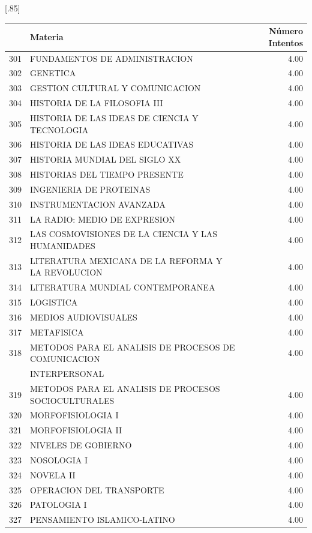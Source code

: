 \documentclass[12pt]{article}
\begin{document}
\begin{table}[ht]
\centering
\scalebox{0.75}[.85]{
\begin{tabular}{rlr}
  \hline
 & Materia & N\'umero Intentos\\ 
  \hline
    301 & FUNDAMENTOS DE ADMINISTRACION & 4.00 \\ 
  302 & GENETICA & 4.00 \\ 
  303 & GESTION CULTURAL Y COMUNICACION & 4.00 \\ 
    304 & HISTORIA DE LA FILOSOFIA III & 4.00 \\ 
  305 & HISTORIA DE LAS IDEAS DE CIENCIA Y TECNOLOGIA & 4.00 \\ 
 306 & HISTORIA DE LAS IDEAS EDUCATIVAS & 4.00 \\ 
  307 & HISTORIA MUNDIAL DEL SIGLO XX & 4.00 \\ 
  308 & HISTORIAS DEL TIEMPO PRESENTE & 4.00 \\ 
  309 & INGENIERIA DE PROTEINAS & 4.00 \\ 
  310 & INSTRUMENTACION AVANZADA & 4.00 \\ 
  311 & LA RADIO: MEDIO DE EXPRESION & 4.00 \\ 
  312 & LAS COSMOVISIONES DE LA CIENCIA Y LAS HUMANIDADES & 4.00 \\ 
  313 & LITERATURA MEXICANA DE LA REFORMA Y LA REVOLUCION & 4.00 \\ 
  314 & LITERATURA MUNDIAL CONTEMPORANEA & 4.00 \\ 
  315 & LOGISTICA & 4.00 \\ 
  316 & MEDIOS AUDIOVISUALES & 4.00 \\ 
  317 & METAFISICA & 4.00 \\ 
  318 & METODOS PARA EL ANALISIS DE PROCESOS DE COMUNICACION  & 4.00 \\
   & INTERPERSONAL &  \\ 
  319 & METODOS PARA EL ANALISIS DE PROCESOS SOCIOCULTURALES & 4.00 \\ 
  320 & MORFOFISIOLOGIA I & 4.00 \\ 
  321 & MORFOFISIOLOGIA II & 4.00 \\ 
  322 & NIVELES DE GOBIERNO & 4.00 \\ 
  323 & NOSOLOGIA I & 4.00 \\ 
  324 & NOVELA II & 4.00 \\ 
  325 & OPERACION DEL TRANSPORTE & 4.00 \\ 
  326 & PATOLOGIA I & 4.00 \\ 
  327& PENSAMIENTO ISLAMICO-LATINO & 4.00 \\ 

\end{tabular}}
\end{table}
\end{document}

